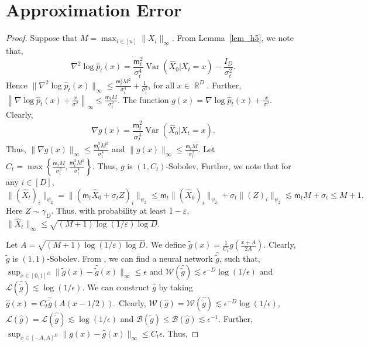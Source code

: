 \documentclass[12pts]{article}
\def\Real{\mathop{\mathbb{R}}\nolimits}
\newcommand{\cB}{ \mathcal{B}}
\newcommand{\cL}{ \mathcal{L}}
\newcommand{\cW}{ \mathcal{W}}
\newcommand{\hX}{ \widehat{X}}
\newcommand{\hp}{\hat{p}}
\begin{document}
\section{Approximation Error}\label{pf_approximation}
\thmapprox*
\begin{proof}
Suppose that $M = \max_{i \in [n]} \|X_i\|_\infty$. From Lemma~\ref{lem_h5}, we note that,
\[\nabla^2 \log \hp_t(x) = \frac{\mathsf{m}_t ^2 }{\sigma_t^4} \operatorname{Var}\left(\hX_0 \big| X_t =x\right) - \frac{I_D}{\sigma_t^2}.\] Hence $\|\nabla^2 \log \hp_t(x)\|_{\infty} \le \frac{\mathsf{m}_t^2 M^2}{\sigma_t^4} + \frac{1}{\sigma_t^2}$, for all $x \in \Real^D$. Further, $\left\|\nabla \log \hp_t(x) + \frac{x}{\sigma^2}\right\|_\infty \le \frac{\mathsf{m}_t M}{\sigma_t^2}$. The function $g(x) = \nabla \log \hp_t(x) + \frac{x}{\sigma^2}$. Clearly,
\[\nabla g(x) = \frac{\mathsf{m}_t ^2 }{\sigma_t^4} \operatorname{Var}\left(\hX_0 \big| X_t =x\right). \]
Thus, $\|\nabla g(x)\|_\infty \le \frac{\mathsf{m}_t^2 M^2}{\sigma_t^4}$ and $\|g(x)\|_\infty \le \frac{\mathsf{m}_t M}{\sigma_t^2}$. Let $C_t = \max\left\{\frac{\mathsf{m}_t M}{\sigma_t^2}, \frac{\mathsf{m}_t^2 M^2}{\sigma_t^4}\right\}$. Thus, $g$ is $(1,C_t)$-Sobolev. Further, we note that for any $i \in [D]$, 
\[\|(\hX_t)_i\|_{\psi_2} =  \|(\mathsf{m}_t \hX_0 + \sigma_t Z)_i\|_{\psi_2} \le \mathsf{m}_t \|(\hX_0)_i\|_{\psi_2} + \sigma_t \|(Z)_i\|_{\psi_2} \lesssim \mathsf{m}_t M +  \sigma_t \le M+1.\] Here $Z \sim \gamma_D$. Thus, with probability at least $1-\varepsilon$, $\|\hX_t\|_\infty \le \sqrt{(M+1)\log(1/\varepsilon) \log D}$.

Let $A = \sqrt{(M+1)\log(1/\varepsilon) \log D}$. We define $\tilde{g}(x) = \frac{1}{C_t}g\left(\frac{x+A}{2A}\right)$. Clearly, $\tilde{g}$ is $(1,1)$-Sobolev. From \citet[Theorem 21]{JMLR:v26:24-0054}, we can find a neural network $\hat{\tilde{g}}$, such that, $\sup_{x \in [0,1]^D} \| \tilde{g}(x) - \hat{\tilde{g}}(x)\|_\infty \le \epsilon$ and $\cW(\hat{\tilde{g}}) \lesssim \epsilon^{-D} \log(1/\epsilon)$ and $\cL(\hat{\tilde{g}}) \lesssim \log(1/\epsilon)$. We can construct $\hat{g}$ by taking $\hat{g}(x) = C_t \hat{\tilde{g}}(A(x-1/2))$. Clearly, $\cW(\hat{g}) = \cW(\hat{\tilde{g}}) \lesssim \epsilon^{-D} \log(1/\epsilon)$, $\cL(\hat{g}) = \cL(\hat{\tilde{g}}) \lesssim \log(1/\epsilon)$ and $\cB(\tilde{g}) \le \cB(\hat{g}) \lesssim \epsilon^{-1}$. Further, $\sup_{x \in [-A,A]^D} \|g(x) - \hat{g}(x)\|_\infty \le C_t \epsilon$. Thus,


\end{proof}
\end{document}
